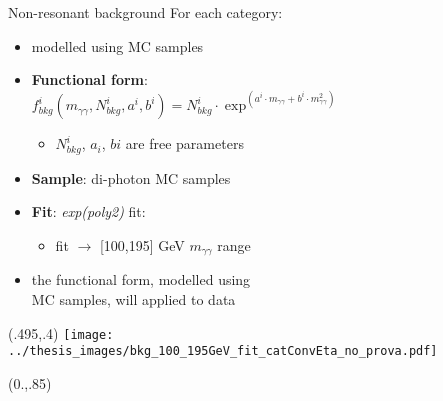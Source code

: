 \documentclass[10pt,UKenglish, leqno, xcolor = dvipsnames]{beamer}
\begin{document}
	\begin{frame}{Non-resonant background}
		\vfill
		For each category:
		\begin{itemize}
			\item modelled using MC samples
			\item \textbf{Functional form}:\\ $f^i_{bkg}(m_{\gamma\gamma},N_{bkg}^i,a^i,b^i) = N_{bkg}^i\cdot\exp^{(a^i\cdot m_{\gamma\gamma}+b^i\cdot m_{\gamma\gamma}^2)}$
			\begin{itemize}
				\item $N^{i}_{bkg}$, $a_i$, $bi$ are free parameters
			\end{itemize} 
			\item \textbf{Sample}: di-photon MC samples
			\item \textbf{Fit}: \textit{exp(poly2)} fit:
			\begin{itemize}
				\item fit $\to$  [100,195] GeV $m_{\gamma\gamma}$ range
			\end{itemize}
			\item the functional form, modelled using\\ MC samples, will applied to data
		\end{itemize}
		\vspace{.5cm}
		\vfill
		\begin{textblock}{1}(.495,.4)
			\texttt{[image: ../thesis\_images/bkg\_100\_195GeV\_fit\_catConvEta\_no\_prova.pdf]}\\	
		\end{textblock}
		\begin{textblock}{1}(0.,.85)
			\begin{figure}
			\end{figure}
		\end{textblock}
	\end{frame}
	
\end{document}
